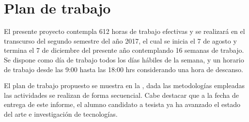 \chapter{Plan de trabajo}
\label{ch:plan_trabajo}

El presente proyecto contempla 612 horas de trabajo efectivas y se realizará en el transcurso del segundo semestre del año 2017, el cual se inicia el 7 de agosto y termina el 7 de diciembre del presente año contemplando 16 semanas de trabajo. Se dispone como día de trabajo todos los días hábiles de la semana, y un horario de trabajo desde las 9:00 hasta las 18:00 hrs considerando una hora de descanso.

El plan de trabajo propuesto se muestra en la , dada las metodologías empleadas las actividades se realizan de forma secuencial. Cabe destacar que a la fecha de entrega de este informe, el alumno candidato a tesista ya ha avanzado el estado del arte e investigación de tecnologías.

\begin{table}[htb]
  \centering
    \label{tab:plan}
\end{table}

